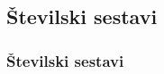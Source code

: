 





    \subsection{Številski sestavi}

        \begin{frame}
            \frametitle{Številski sestavi}
        \end{frame}

